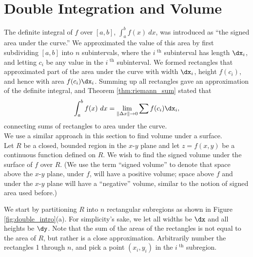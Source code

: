 \section{Double Integration and Volume}\label{sec:double_int_volume}

The definite integral of $f$ over $[a,b]$, $\int_a^b f(x)\ dx$, was introduced as ``the signed area under the curve.'' We approximated the value of this area by first subdividing $[a,b]$ into $n$ subintervals, where the $i^\text{ th}$ subinterval has length $\dx_i$, and letting $c_i$ be any value in the $i^\text{ th}$ subinterval. We formed rectangles that approximated part of the area under the curve with width $\dx_i$, height $f(c_i)$, and hence with area $f(c_i)\dx_i$. Summing up all rectangles gave an approximation of the definite integral, and Theorem \ref{thm:riemann_sum} stated that
$$\int_a^bf(x)\ dx = \lim_{\|\Delta x\|\to 0}\sum f(c_i)\dx_i,$$
connecting sums of rectangles to area under the curve.\\

We use a similar approach in this section to find volume under a surface.\\

Let $R$ be a closed, bounded region in the $x$-$y$ plane and let $z=f(x,y)$ be a continuous function defined on $R$. We wish to find the signed volume under the surface of $f$ over $R$. (We use the term ``signed volume'' to denote that space above the $x$-$y$ plane, under $f$, will have a positive volume; space above $f$ and under the $x$-$y$ plane will have a ``negative'' volume, similar to the notion of signed area used before.)

We start by partitioning $R$ into $n$ rectangular subregions as shown in Figure \ref{fig:double_intro}(a). For simplicity's sake, we let all widths be $\dx$ and all heights be $\dy$. Note that the sum of the areas of the rectangles is not equal to the area of $R$, but rather is a close approximation. Arbitrarily number the rectangles 1 through $n$, and pick a point $(x_i,y_i)$ in the $i^\text{ th}$ subregion. 

